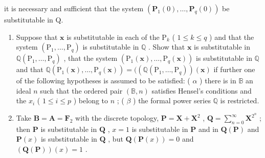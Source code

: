 it is necessary and sufficient that the system \((\mathbf{P}_{1}(0),\ldots,\mathbf{P}_{q}(0))\) be substitutable in Q.

\begin{enumerate}
\def\labelenumi{(\alph{enumi})}
\setcounter{enumi}{4}
\item
  Suppose that \(\mathbf{x}\) is substitutable in each of the \(\mathrm{P}_k\) ( \(1 \leqslant k \leqslant q\) ) and that the system \((\mathrm{P}_1, \ldots, \mathrm{P}_q)\) is substitutable in \(\mathbb{Q}\) . Show that \(\mathbf{x}\) is substitutable in \(\mathbb{Q}(\mathrm{P}_1, \ldots, \mathrm{P}_q)\) , that the system \((\mathrm{P}_1(\mathbf{x}), \ldots, \mathrm{P}_q(\mathbf{x}))\) is substitutable in \(\mathbb{Q}\) and that \(\mathbb{Q}(\mathrm{P}_1(\mathbf{x}), \ldots, \mathrm{P}_q(\mathbf{x})) = ((\mathbb{Q}(\mathrm{P}_1, \ldots, \mathrm{P}_q))(\mathbf{x})\) if further one of the following hypotheses is assumed to be satisfied: ( \(\alpha\) ) there is in \(\mathbb{B}\) an ideal \(n\) such that the ordered pair \((\mathbb{B}, n)\) satisfies Hensel's conditions and the \(x_i\) ( \(1 \leqslant i \leqslant p\) ) belong to \(n\) ; ( \(\beta\) ) the formal power series \(\mathbb{Q}\) is restricted.
\item
  Take \(\mathbf{B} = \mathbf{A} = \mathbf{F}_2\) with the discrete topology, \(\mathbf{P} = \mathbf{X} + \mathbf{X}^2\) , \(\mathbf{Q} = \sum_{n=0}^{\infty} \mathbf{X}^{2^n}\) ; then \(\mathbf{P}\) is substitutable in \(\mathbf{Q}\) , \(x = 1\) is substitutable in \(\mathbf{P}\) and in \(\mathbf{Q}(\mathbf{P})\) and \(\mathbf{P}(x)\) is substitutable in \(\mathbf{Q}\) , but \(\mathbf{Q}(\mathbf{P}(x)) = 0\) and \((\mathbf{Q}(\mathbf{P}))(x) = 1\) .
\end{enumerate}
